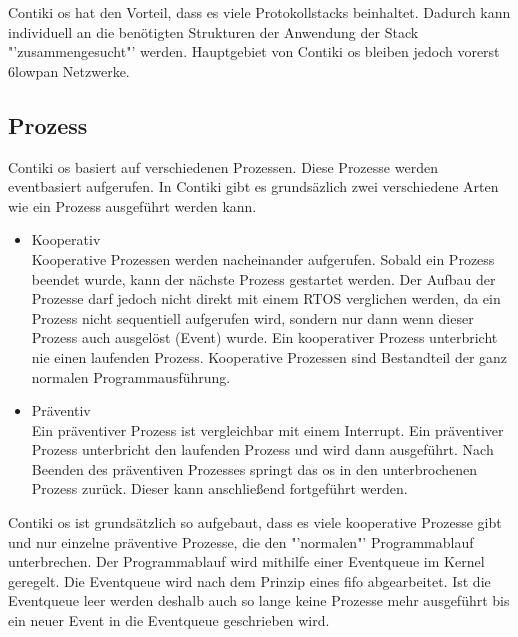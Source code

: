 	Contiki \ac{os} hat den Vorteil, dass es viele Protokollstacks beinhaltet. Dadurch kann individuell an die benötigten Strukturen der Anwendung der Stack "'zusammengesucht"' werden. Hauptgebiet von Contiki \ac{os} bleiben jedoch vorerst \ac{6lowpan} Netzwerke.
	
	\subsection{Prozess}
	Contiki \ac{os} basiert auf verschiedenen Prozessen. Diese Prozesse werden eventbasiert aufgerufen. In Contiki gibt es grundsäzlich zwei verschiedene Arten wie ein Prozess ausgeführt werden kann.
	\begin{itemize}
		\item Kooperativ\\
		Kooperative Prozessen werden nacheinander aufgerufen. Sobald ein Prozess beendet wurde, kann der nächste Prozess gestartet werden. Der Aufbau der Prozesse darf jedoch nicht direkt mit einem RTOS verglichen werden, da ein Prozess nicht sequentiell aufgerufen wird, sondern nur dann wenn dieser Prozess auch ausgelöst (Event) wurde. Ein kooperativer Prozess unterbricht nie einen laufenden Prozess. Kooperative Prozessen sind Bestandteil der ganz normalen Programmausführung.
		\item Präventiv\\
		Ein präventiver Prozess ist vergleichbar mit einem Interrupt. Ein präventiver Prozess unterbricht den laufenden Prozess und wird dann ausgeführt. Nach Beenden des präventiven Prozesses springt das \ac{os} in den unterbrochenen Prozess zurück. Dieser kann anschließend fortgeführt werden. 
	\end{itemize}
	
	Contiki \ac{os} ist grundsätzlich so aufgebaut, dass es viele kooperative Prozesse gibt und nur einzelne präventive Prozesse, die den "'normalen"' Programmablauf unterbrechen. Der Programmablauf wird mithilfe einer Eventqueue im Kernel geregelt. Die Eventqueue wird nach dem Prinzip eines \ac{fifo} abgearbeitet. Ist die Eventqueue leer werden deshalb auch so lange keine Prozesse mehr ausgeführt bis ein neuer Event in die Eventqueue geschrieben wird.
	
